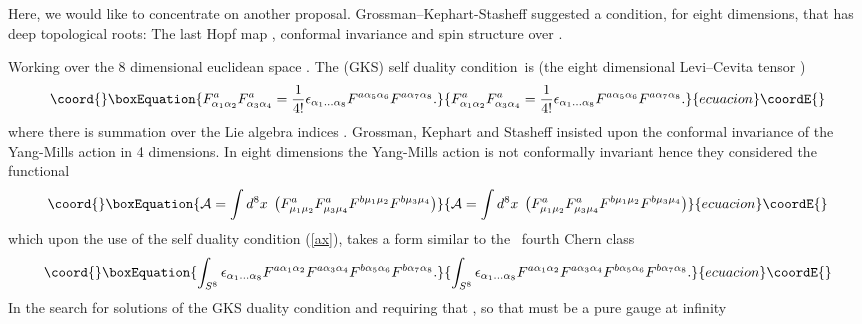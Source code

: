 \documentclass[a4paper,12pt]{book}
\begin{document}
Here, we would like to concentrate on another proposal.
Grossman--Kephart-Stasheff \cite{gks} suggested a condition, for eight
dimensions, that has deep topological roots: The last Hopf map \coordHE{}, conformal invariance
and spin structure over \coordHE{}\cite{landi}.

Working over the 8 dimensional euclidean space \coordHE{}. The (GKS) self
duality condition\ is (the eight dimensional Levi--Cevita tensor \coordHE{}) 
\begin{equation}\coord{}\boxEquation{
F_{\alpha _{1}\alpha _{2}}^{a}F_{\alpha _{3}\alpha _{4}}^{a}=\frac{1}{4!}
\epsilon _{\alpha _{1}\ldots \alpha _{8}}F^{a\alpha _{5}\alpha
_{6}}F^{a\alpha _{7}\alpha _{8}}.  \label{ax}
}{
F_{\alpha _{1}\alpha _{2}}^{a}F_{\alpha _{3}\alpha _{4}}^{a}=\frac{1}{4!}
\epsilon _{\alpha _{1}\ldots \alpha _{8}}F^{a\alpha _{5}\alpha
_{6}}F^{a\alpha _{7}\alpha _{8}}.  }{ecuacion}\coordE{}\end{equation}
where there is summation over the Lie algebra indices \coordHE{}. Grossman, Kephart
and Stasheff insisted upon the conformal invariance of the Yang-Mills action
in 4 dimensions. In eight dimensions the Yang-Mills action is not
conformally invariant hence they considered the functional 
\begin{equation}\coord{}\boxEquation{
\mathcal{A}=\int d^{8}x\;\left( F_{\mu _{1}\mu _{2}}^{a}F_{\mu _{3}\mu
_{4}}^{a}F^{b\mu _{1}\mu _{2}}F^{b\mu _{3}\mu _{4}}\right)
}{
\mathcal{A}=\int d^{8}x\;\left( F_{\mu _{1}\mu _{2}}^{a}F_{\mu _{3}\mu
_{4}}^{a}F^{b\mu _{1}\mu _{2}}F^{b\mu _{3}\mu _{4}}\right)
}{ecuacion}\coordE{}\end{equation}
which upon the use of the self duality condition (\ref{ax}), takes a form
similar to the \ fourth Chern class 
\begin{equation}\coord{}\boxEquation{
\int_{S^{8}}\epsilon _{\alpha _{1}\ldots \alpha _{8}}F^{a\alpha _{1}\alpha
_{2}}F^{a\alpha _{3}\alpha _{4}}F^{b\alpha _{5}\alpha _{6}}F^{b\alpha
_{7}\alpha _{8}}.
}{
\int_{S^{8}}\epsilon _{\alpha _{1}\ldots \alpha _{8}}F^{a\alpha _{1}\alpha
_{2}}F^{a\alpha _{3}\alpha _{4}}F^{b\alpha _{5}\alpha _{6}}F^{b\alpha
_{7}\alpha _{8}}.
}{ecuacion}\coordE{}\end{equation}
In the search for solutions of the GKS duality condition and requiring that \coordHE{}, so that \coordHE{} must be a pure gauge at infinity 
\end{document}
